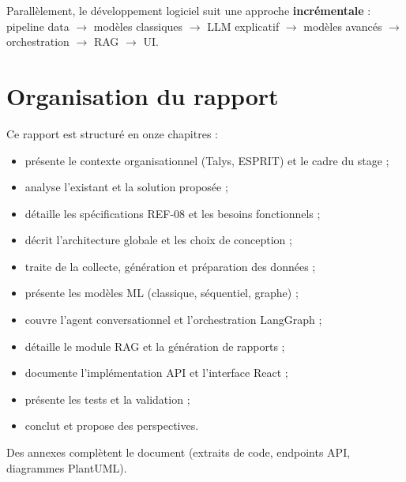 Parallèlement, le développement logiciel suit une approche \textbf{incrémentale} : pipeline data $\rightarrow$ modèles classiques $\rightarrow$ LLM explicatif $\rightarrow$ modèles avancés $\rightarrow$ orchestration $\rightarrow$ RAG $\rightarrow$ UI.

\section{Organisation du rapport}

Ce rapport est structuré en onze chapitres :
\begin{itemize}[leftmargin=*]
  \item {} présente le contexte organisationnel (Talys, ESPRIT) et le cadre du stage ;
  \item {} analyse l'existant et la solution proposée ;
  \item {} détaille les spécifications REF-08 et les besoins fonctionnels ;
  \item {} décrit l'architecture globale et les choix de conception ;
  \item {} traite de la collecte, génération et préparation des données ;
  \item {} présente les modèles ML (classique, séquentiel, graphe) ;
  \item {} couvre l'agent conversationnel et l'orchestration LangGraph ;
  \item {} détaille le module RAG et la génération de rapports ;
  \item {} documente l'implémentation API et l'interface React ;
  \item {} présente les tests et la validation ;
  \item {} conclut et propose des perspectives.
\end{itemize}

Des annexes complètent le document (extraits de code, endpoints API, diagrammes PlantUML).

